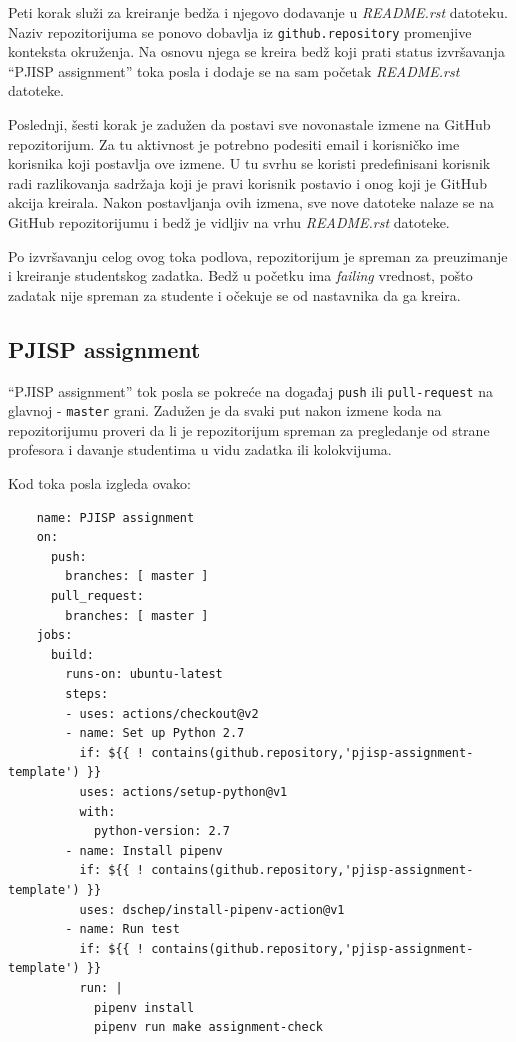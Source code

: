\documentclass[12pt]{report}
\begin{document}
Peti korak služi za kreiranje bedža i njegovo dodavanje u \textit{README.rst} datoteku. Naziv repozitorijuma se ponovo dobavlja iz \texttt{github.repository} promenjive konteksta okruženja. Na osnovu njega se kreira bedž koji prati status izvršavanja ``PJISP assignment'' toka posla i dodaje se na sam početak \textit{README.rst} datoteke.

Poslednji, šesti korak je zadužen da postavi sve novonastale izmene na GitHub repozitorijum. Za tu aktivnost je potrebno podesiti email i korisničko ime korisnika koji postavlja ove izmene. U tu svrhu se koristi predefinisani korisnik radi razlikovanja sadržaja koji je pravi korisnik postavio i onog koji je GitHub akcija kreirala. Nakon postavljanja ovih izmena, sve nove datoteke nalaze se na GitHub repozitorijumu i bedž je vidljiv na vrhu \textit{README.rst} datoteke.

Po izvršavanju celog ovog toka podlova, repozitorijum je spreman za preuzimanje i kreiranje studentskog zadatka. Bedž u početku ima \textit{failing} vrednost, pošto zadatak nije spreman za studente i očekuje se od nastavnika da ga kreira.

\subsection{PJISP assignment}
``PJISP assignment'' tok posla se pokreće na događaj \texttt{push} ili \texttt{pull-request} na glavnoj - \texttt{master} grani. Zadužen je da svaki put nakon izmene koda na repozitorijumu proveri da li je repozitorijum spreman za pregledanje od strane profesora i davanje studentima u vidu zadatka ili kolokvijuma.

Kod toka posla izgleda ovako:

\begin{verbatim}
    name: PJISP assignment
    on:
      push:
        branches: [ master ]
      pull_request:
        branches: [ master ]
    jobs:
      build:
        runs-on: ubuntu-latest
        steps:
        - uses: actions/checkout@v2
        - name: Set up Python 2.7
          if: ${{ ! contains(github.repository,'pjisp-assignment-template') }}
          uses: actions/setup-python@v1
          with:
            python-version: 2.7
        - name: Install pipenv
          if: ${{ ! contains(github.repository,'pjisp-assignment-template') }}
          uses: dschep/install-pipenv-action@v1
        - name: Run test
          if: ${{ ! contains(github.repository,'pjisp-assignment-template') }}
          run: |
            pipenv install
            pipenv run make assignment-check
\end{verbatim}
\end{document}

